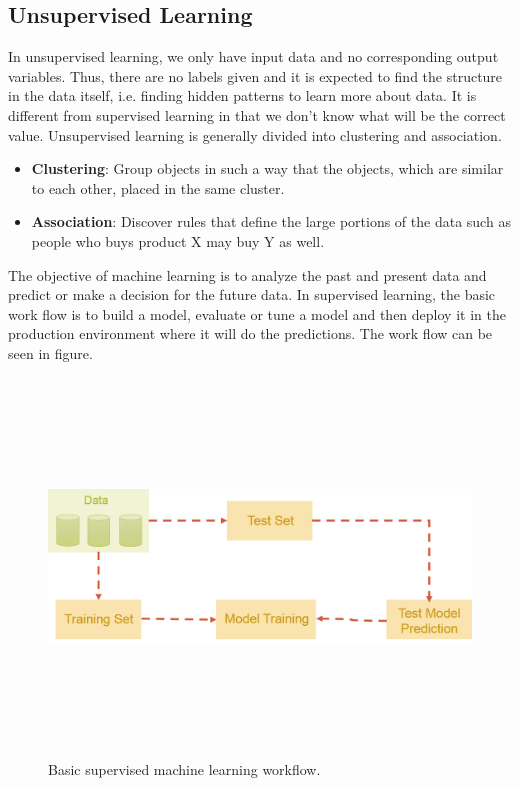 \subsection{Unsupervised Learning}

In unsupervised learning, we only have input data and no corresponding output variables. Thus, there are no labels given and it is expected to find the structure in the data itself, i.e. finding hidden patterns to learn more about data. It is different from supervised learning in that we don't know what will be the correct value. Unsupervised learning is generally divided into clustering and association.

\begin{itemize}
	\item \textbf{Clustering}: Group objects in such a way that the objects, which are similar to each other, placed in the same cluster.
	\item \textbf{Association}: Discover rules that define the large portions of the data such as people who buys product X may buy Y as well.
\end{itemize}

The objective of machine learning is to analyze the past and present data and predict or make a decision for the future data. In supervised learning, the basic work flow is to build a model, evaluate or tune a model and then deploy it in the production environment where it will do the predictions. The work flow can be seen in figure.


\begin{figure}[htpb]
	\centering
	\includegraphics[width=12cm,height=10cm,keepaspectratio=true]{images/basic-ml-model.png}
	\caption{
		Basic supervised machine learning workflow.
	}
	\label{fig:basic-ml-model}
\end{figure}


